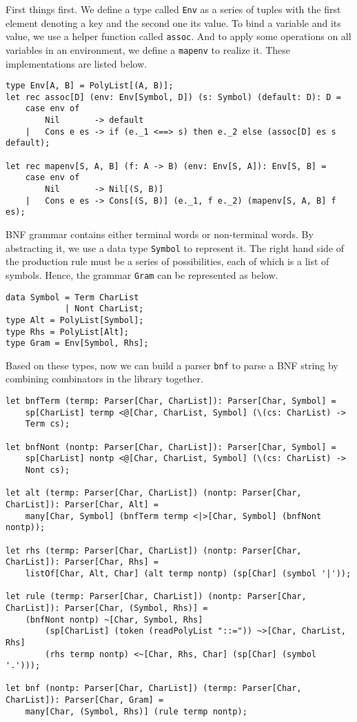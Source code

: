 First things first. We define a type called \texttt{Env} as a series of tuples with the first element denoting a key and the second one its value. To bind a variable and its value, we use a helper function called \texttt{assoc}. And to apply some operations on all variables in an environment, we define a \texttt{mapenv} to realize it. These implementations are listed below.
\begin{lstlisting}
type Env[A, B] = PolyList[(A, B)];
let rec assoc[D] (env: Env[Symbol, D]) (s: Symbol) (default: D): D =
    case env of
        Nil       -> default
    |   Cons e es -> if (e._1 <==> s) then e._2 else (assoc[D] es s default);

let rec mapenv[S, A, B] (f: A -> B) (env: Env[S, A]): Env[S, B] =
    case env of
        Nil       -> Nil[(S, B)]
    |   Cons e es -> Cons[(S, B)] (e._1, f e._2) (mapenv[S, A, B] f es);
\end{lstlisting}
BNF grammar contains either terminal words or non-terminal words. By abstracting it, we use a data type \texttt{Symbol} to represent it. The right hand side of the production rule must be a series of possibilities, each of which is a list of symbols. Hence, the grammar \texttt{Gram} can be represented as below.
\begin{lstlisting}
data Symbol = Term CharList
            | Nont CharList;
type Alt = PolyList[Symbol];
type Rhs = PolyList[Alt];
type Gram = Env[Symbol, Rhs];
\end{lstlisting}
Based on these types, now we can build a parser \texttt{bnf} to parse a BNF string by combining combinators in the library together.
\begin{lstlisting}
let bnfTerm (termp: Parser[Char, CharList]): Parser[Char, Symbol] =
    sp[CharList] termp <@[Char, CharList, Symbol] (\(cs: CharList) ->
    Term cs);

let bnfNont (nontp: Parser[Char, CharList]): Parser[Char, Symbol] =
    sp[CharList] nontp <@[Char, CharList, Symbol] (\(cs: CharList) ->
    Nont cs);

let alt (termp: Parser[Char, CharList]) (nontp: Parser[Char, CharList]): Parser[Char, Alt] =
    many[Char, Symbol] (bnfTerm termp <|>[Char, Symbol] (bnfNont nontp));

let rhs (termp: Parser[Char, CharList]) (nontp: Parser[Char, CharList]): Parser[Char, Rhs] =
    listOf[Char, Alt, Char] (alt termp nontp) (sp[Char] (symbol '|'));

let rule (termp: Parser[Char, CharList]) (nontp: Parser[Char, CharList]): Parser[Char, (Symbol, Rhs)] =
    (bnfNont nontp) ~[Char, Symbol, Rhs]
        (sp[CharList] (token (readPolyList "::=")) ~>[Char, CharList, Rhs]
        (rhs termp nontp) <~[Char, Rhs, Char] (sp[Char] (symbol '.')));

let bnf (nontp: Parser[Char, CharList]) (termp: Parser[Char, CharList]): Parser[Char, Gram] =
    many[Char, (Symbol, Rhs)] (rule termp nontp);
\end{lstlisting}
